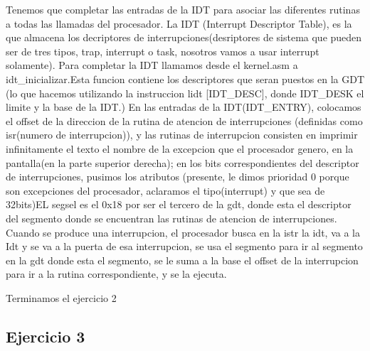 \documentclass[a4paper]{article}
\begin{document}
Tenemos que completar las entradas de la IDT para asociar las diferentes rutinas a todas las llamadas del procesador. La IDT (Interrupt Descriptor Table), es la que almacena los decriptores de interrupciones(desriptores de sistema que pueden ser de tres tipos, trap, interrupt o task, nosotros vamos a usar interrupt solamente).  	
	Para completar la IDT llamamos desde el kernel.asm a idt_inicializar.Esta funcion contiene los descriptores que seran puestos en la GDT (lo que hacemos utilizando la instruccion lidt [IDT_DESC], donde IDT_DESK el limite y la base de la IDT.)
	En las entradas de la IDT(IDT_ENTRY), colocamos el offset de la direccion de la rutina de atencion de interrupciones (definidas como isr(numero de interrupcion)), y las rutinas de interrupcion consisten en imprimir infinitamente el texto el nombre de  la excepcion que el procesador genero,  en la pantalla(en la parte superior derecha); en los bits correspondientes del descriptor de interrupciones, pusimos los atributos (presente, le dimos prioridad 0 porque son excepciones del procesador, aclaramos el tipo(interrupt) y que sea de 32bits)EL segsel es el 0x18 por ser el tercero de la gdt, donde esta el descriptor del segmento donde se encuentran las rutinas de atencion de interrupciones.
	Cuando se produce una interrupcion, el procesador busca en la istr la idt, va a la Idt y se va a la puerta de esa interrupcion, se usa el segmento para ir al segmento en la gdt donde esta el segmento, se le suma a la base el offset de la interrupcion para ir a la rutina correspondiente, y se la ejecuta.
	 
Terminamos el ejercicio 2
	

\subsection{Ejercicio 3}
\end{document}
